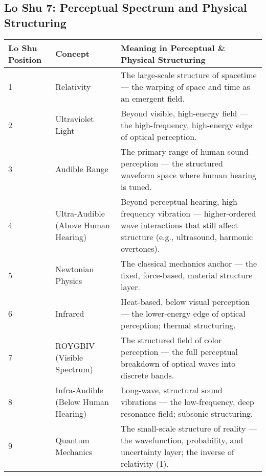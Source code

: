 \documentclass{article}
\begin{document}
\begin{landscape}

\section*{Lo Shu 7: Perceptual Spectrum and Physical Structuring}

\renewcommand{\arraystretch}{1.4}

\begin{tabular}{|p{1.8cm}|p{4.8cm}|p{9.2cm}|}
\hline
\textbf{Lo Shu Position} & 
\textbf{Concept} & 
\textbf{Meaning in Perceptual \& Physical Structuring} \\
\hline

1 & 
Relativity & 
The large-scale structure of spacetime — the warping of space and time as an emergent field. \\
\hline

2 & 
Ultraviolet Light & 
Beyond visible, high-energy field — the high-frequency, high-energy edge of optical perception. \\
\hline

3 & 
Audible Range & 
The primary range of human sound perception — the structured waveform space where human hearing is tuned. \\
\hline

4 & 
Ultra-Audible (Above Human Hearing) & 
Beyond perceptual hearing, high-frequency vibration — higher-ordered wave interactions that still affect structure (e.g., ultrasound, harmonic overtones). \\
\hline

5 & 
Newtonian Physics & 
The classical mechanics anchor — the fixed, force-based, material structure layer. \\
\hline

6 & 
Infrared & 
Heat-based, below visual perception — the lower-energy edge of optical perception; thermal structuring. \\
\hline

7 & 
ROYGBIV (Visible Spectrum) & 
The structured field of color perception — the full perceptual breakdown of optical waves into discrete bands. \\
\hline

8 & 
Infra-Audible (Below Human Hearing) & 
Long-wave, structural sound vibrations — the low-frequency, deep resonance field; subsonic structuring. \\
\hline

9 & 
Quantum Mechanics & 
The small-scale structure of reality — the wavefunction, probability, and uncertainty layer; the inverse of relativity (1). \\
\hline

\end{tabular}

\end{landscape}
\end{document}
